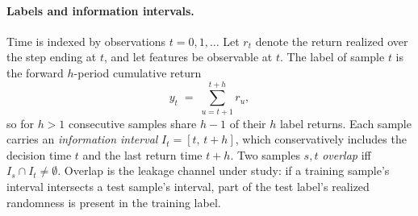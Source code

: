 \documentclass[11pt]{article}
\begin{document}
\paragraph{Labels and information intervals.} Time is indexed by observations
$t = 0, 1, \dots$ Let $r_t$ denote the return realized over the step ending
at $t$, and let features be observable at $t$. The label of sample $t$ is the
forward $h$-period cumulative return
\begin{equation}
y_t \;=\; \sum_{u=t+1}^{t+h} r_u ,
\label{eq:label}
\end{equation}
so for $h>1$ consecutive samples share $h-1$ of their $h$ label returns. Each
sample carries an \emph{information interval} $I_t = [t,\, t+h]$, which
conservatively includes the decision time $t$ and the last return time $t+h$.
Two samples $s, t$ \emph{overlap} iff $I_s \cap I_t \neq \emptyset$. Overlap
is the leakage channel under study: if a training sample's interval
intersects a test sample's interval, part of the test label's realized
randomness is present in the training label.
\end{document}
